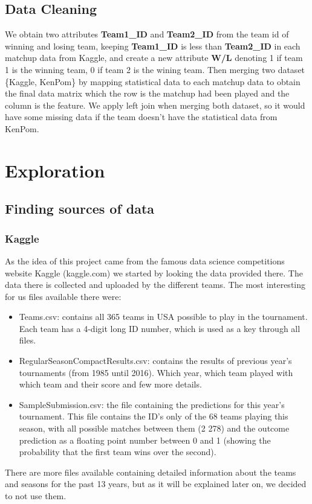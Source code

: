 \documentclass[
10pt, %
a4paper, %
oneside, %
headinclude,footinclude, %
BCOR5mm, %
]{scrartcl}
\begin{document}
\subsection{Data Cleaning}
We obtain two attributes \textbf{Team1\_ID} and \textbf{Team2\_ID} from the team id of winning and losing team, keeping \textbf{Team1\_ID} is less than \textbf{Team2\_ID} in each matchup data from Kaggle, and create a new attribute \textbf{W/L} denoting 1 if team 1 is the winning team, 0 if team 2 is the wining team. Then merging two dataset \{Kaggle, KenPom\} by mapping statistical data to each matchup data to obtain the final data matrix which the row is the matchup had been played and the column is the feature. We apply left join when merging both dataset, so it would have some missing data if the team doesn't have the statistical data from KenPom.


\section{Exploration}
\subsection{Finding sources of data}
\subsubsection{Kaggle}
As the idea of this project came from the famous data science competitions website Kaggle (kaggle.com) we started by looking the data provided there. The data there is collected and uploaded by the different teams. The most interesting for us files available there were:
\begin{itemize}
\item Teams.csv: contains all 365 teams in USA possible to play in the tournament. Each team has a 4-digit long ID number, which is used as a key through all files.
\item RegularSeasonCompactResults.csv: contains the results of previous year's tournaments (from 1985 until 2016). Which year, which team played with which team and their score and few more details.
\item SampleSubmission.csv: the file containing the predictions for this year's tournament. This file contains the ID’s only of the 68 teams playing this season, with all possible matches between them (2 278) and the outcome prediction as a floating point number between 0 and 1 (showing the probability that the first team wins over the second).
\end{itemize}
There are more files available containing detailed information about the teams and seasons for the past 13 years, but as it will be explained later on, we decided to not use them.
\end{document}
